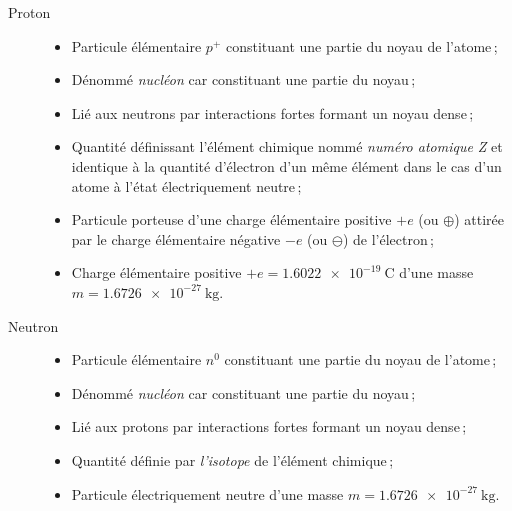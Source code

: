 \begin{description}
	\item[Proton]\hfill %
		\begin{itemize}
			\item Particule élémentaire $p^+$ constituant une partie du noyau de l'atome\,;
			\item Dénommé \emph{nucléon} car constituant une partie du noyau\,;
			\item Lié aux neutrons par interactions fortes formant un noyau dense\,;
			\item Quantité définissant l'élément chimique nommé \emph{numéro atomique Z} et identique à la quantité d'électron d'un même élément dans le cas d'un atome à l'état électriquement neutre\,; 
			\item Particule porteuse d'une charge élémentaire positive $+e$ (ou $\oplus$) attirée par le charge élémentaire négative $-e$ (ou $\ominus$) de l'électron\,;
			\item Charge élémentaire positive $+e=\SI{1,6022e-19}{\coulomb}$ d'une masse $m=\SI{1,6726e-27}{\kilogram}$.
		\end{itemize}

	\item[Neutron]\hfill %
		\begin{itemize}
			\item Particule élémentaire $n^0$ constituant une partie du noyau de l'atome\,; %
			\item Dénommé \emph{nucléon} car constituant une partie du noyau\,;
			\item Lié aux protons par interactions fortes formant un noyau dense\,;
			\item Quantité définie par \emph{l'isotope} de l'élément chimique\,; 
			\item Particule électriquement neutre d'une masse $m=\SI{1,6726e-27}{\kilogram}$. %
		\end{itemize}


\end{description}
